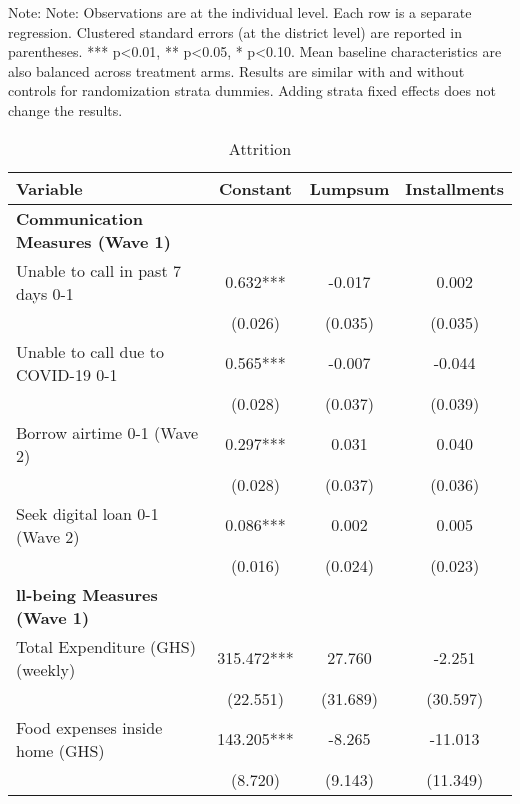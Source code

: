 \begin{ThreePartTable}
\begin{TableNotes}[flushleft]
\footnotesize
\item Note:                                  Note: Observations are at the individual level. Each row is a separate regression. Clustered standard errors (at the district level) are reported in parentheses. *** p<0.01, ** p<0.05, * p<0.10. Mean baseline characteristics are also balanced across treatment arms. Results are similar with and without controls for randomization strata dummies. Adding strata fixed effects does not change the results.                                 
\end{TableNotes}
\begin{table}[tbp]\centering
\def\sym#1{\ifmmode^{#1}\else\(^{#1}\)\fi}
\caption{Attrition}
\begin{tabular}{lccc}
\hline
 Variable & Constant & Lumpsum & Installments \\ [0.1em] 
\hline\hline
\textbf{Communication Measures (Wave 1)} & & & \\ 
 Unable to call in past 7 days 0-1 & 0.632*** & -0.017 & 0.002 \\ [0.1em] 
                   &      (0.026)     &      (0.035)     &      (0.035)     \\ [0.1em] 
 Unable to call due to COVID-19 0-1 & 0.565*** & -0.007 & -0.044 \\ [0.1em] 
                   &      (0.028)     &      (0.037)     &      (0.039)     \\ [0.1em] 
 Borrow airtime 0-1 (Wave 2) & 0.297*** & 0.031 & 0.040 \\ [0.1em] 
                   &      (0.028)     &      (0.037)     &      (0.036)     \\ [0.1em] 
 Seek digital loan 0-1 (Wave 2) & 0.086*** & 0.002 & 0.005 \\ [0.1em] 
                   &      (0.016)     &      (0.024)     &      (0.023)     \\ [0.1em] 
\textbf{ll-being Measures (Wave 1)} & & & \\ 
 Total Expenditure (GHS) (weekly) & 315.472*** & 27.760 & -2.251 \\ [0.1em] 
                   &      (22.551)     &      (31.689)     &      (30.597)     \\ [0.1em] 
 Food expenses inside home (GHS) & 143.205*** & -8.265 & -11.013 \\ [0.1em] 
                   &      (8.720)     &      (9.143)     &      (11.349)     \\ [0.1em] 

\end{tabular}
\end{table}
\end{ThreePartTable}
